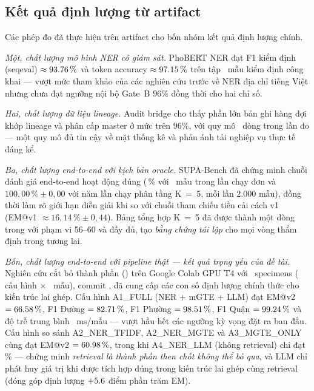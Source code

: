 \subsection{Kết quả định lượng từ artifact}
\label{sec:concl-quantitative}

Các phép đo đã thực hiện trên artifact cho bốn nhóm kết quả định lượng chính.

\emph{Một, chất lượng mô hình NER có giám sát.} PhoBERT NER đạt F1 kiểm định (seqeval) \(\approx 93.76\,\%\) và token accuracy \(\approx 97.15\,\%\) trên tập \VNAIGENNEREvalN\, mẫu kiểm định công khai --- vượt mức tham khảo của các nghiên cứu trước về NER địa chỉ tiếng Việt nhưng chưa đạt ngưỡng nội bộ Gate~B \(96\%\) đồng thời cho hai chỉ số.

\emph{Hai, chất lượng dữ liệu lineage.} Audit bridge cho thấy phần lớn bản ghi hàng đợi khớp lineage và phân cấp master ở mức trên \(96\%\), với quy mô \VNAIGENAuditQueueTotal\, dòng trong lần đo --- một quy mô đủ tin cậy về mặt thống kê và phản ánh tải nghiệp vụ thực tế đáng kể.

\emph{Ba, chất lượng end-to-end với kịch bản oracle.} SUPA-Bench đã chứng minh chuỗi đánh giá end-to-end hoạt động đúng (\VNASUPAEMvTwoPct\,\% với \VNASUPANRequested\, mẫu trong lần chạy đơn và \(100{,}00\,\% \pm 0{,}00\) với năm lần chạy phân tầng K~=~5, mỗi lần \(2.000\) mẫu), đồng thời làm rõ giới hạn diễn giải khi so với chuỗi tham chiếu tiền cải cách v1 (EM@v1 \(\approx 16{,}14\,\% \pm 0{,}44\)). Bảng tổng hợp K~=~5 đã được  thành một dòng trong  với phạm vi  56--60 và  đầy đủ, tạo \emph{bằng chứng tái lập} cho mọi vòng thẩm định trong tương lai.

\emph{Bốn, chất lượng end-to-end với pipeline thật --- kết quả trọng yếu của đề tài.} Nghiên cứu cắt bỏ thành phần () trên Google Colab GPU T4 với \VNAIABLATIONTotalSpecimens\, specimens (\VNAIABLATIONNumConfigs\, cấu hình \(\times\) \VNAIABLATIONNPerConfig\, mẫu), commit \texttt{\VNAIABLATIONGitCommit}, đã cung cấp các con số định lượng chính thức cho kiến trúc lai ghép. Cấu hình A1\_FULL (NER + mGTE + LLM) đạt EM@v2 \(= 66.58\,\%\), F1 Đường \(= 82.71\,\%\), F1 Phường \(= 98.51\,\%\), F1 Quận \(= 99.24\,\%\) và độ trễ trung bình \VNAIABLATIONAOneLatencyMs\, ms/mẫu --- vượt hầu hết các ngưỡng kỳ vọng đặt ra ban đầu. Cấu hình so sánh A2\_NER\_TFIDF, A2\_NER\_MGTE và A3\_MGTE\_ONLY cùng đạt EM@v2 \(= 60.98\,\%\), trong khi A4\_NER\_LLM (không retrieval) chỉ đạt \VNAIABLATIONAFourEMvTwoPct\,\% --- chứng minh \emph{retrieval là thành phần then chốt không thể bỏ qua}, và LLM chỉ phát huy giá trị khi được tích hợp đúng trong kiến trúc lai ghép cùng retrieval (đóng góp định lượng \(+5.6\) điểm phần trăm EM).

